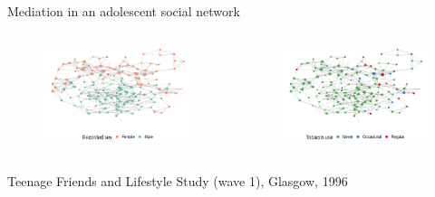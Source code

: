 \documentclass[aspectratio=169]{beamer}
\theoremstyle{remark}
\begin{document}
\begin{frame}{Mediation in an adolescent social network}

    \begin{columns}


        \begin{figure}[ht]
            \raggedleft
            \includegraphics[width=1.1\textwidth]{figures/glasgow/sex.png}
        \end{figure}


        \begin{figure}[ht]
            \raggedright
            \includegraphics[width=1.1\textwidth]{figures/glasgow/tobacco.png}
        \end{figure}
    \end{columns}

    \centering
    \scriptsize Teenage Friends and Lifestyle Study (wave 1), Glasgow, 1996

\end{frame}
\end{document}
